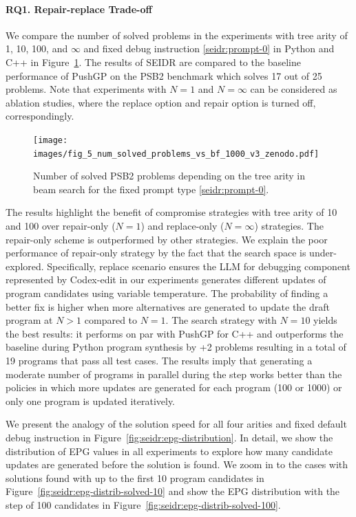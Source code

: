 \paragraph{RQ1. Repair-replace Trade-off}
\label{sec:seidr-seidr:rq1}
We compare the number of solved problems in the experiments with tree arity of 1, 10, 100, and $\infty$ and fixed debug instruction \ref{seidr:prompt-0} in Python and C++ in Figure~\ref{fig:seidr:solved-vs-bf}. 
The results of SEIDR are compared to the baseline performance of PushGP on the PSB2 benchmark which solves 17 out of 25 problems. 
Note that experiments with $N=1$ and $N=\infty$ can be considered as ablation studies, where the replace option and repair option is turned off, correspondingly. 

\begin{figure}[t]
  \centering
  \texttt{[image: images/fig\_5\_num\_solved\_problems\_vs\_bf\_1000\_v3\_zenodo.pdf]}
  \caption{Number of solved PSB2 problems depending on the tree arity in beam search for the fixed prompt type \ref{seidr:prompt-0}.}
  \label{fig:seidr:solved-vs-bf}
  \vspace*{-2ex}
\end{figure}

The results highlight the benefit of compromise strategies with tree arity of 10 and 100 over repair-only ($N=1$) and replace-only ($N=\infty$) strategies. 
The repair-only scheme is outperformed by other strategies. 
We explain the poor performance of repair-only strategy by the fact that the search space is under-explored. 
Specifically, replace scenario ensures the LLM for debugging component represented by Codex-edit in our experiments generates different updates of program candidates using variable temperature.
The probability of finding a better fix is higher when more alternatives are generated to update the draft program at $N>1$ compared to $N=1$. 
The search strategy with $N=10$ yields the best results: it performs on par with PushGP for C++ and outperforms the baseline during Python program synthesis by +2 problems resulting in a total of 19 programs that pass all test cases.
The results imply that generating a moderate number of programs in parallel during the \debug{} step works better than the policies in which more updates are generated for each program (100 or 1000) or only one program is updated iteratively.

We present the analogy of the solution speed for all four arities and fixed default debug instruction in Figure~\ref{fig:seidr:epg-distribution}. 
In detail, we show the distribution of EPG values in all experiments to explore how many candidate updates are generated before the solution is found.
We zoom in to the cases with solutions found with up to the first 10 program candidates in Figure~\ref{fig:seidr:epg-distrib-solved-10} and show the EPG distribution with the step of 100 candidates in Figure~\ref{fig:seidr:epg-distrib-solved-100}. 

